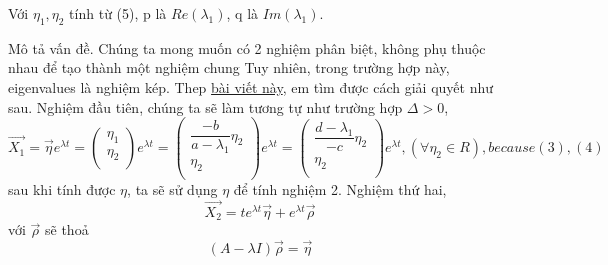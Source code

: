     \begin{center}
        Với
        $\eta_1, \eta_2$ tính từ (5),
        p là $Re(\lambda_1)$,
        q là $Im(\lambda_1)$.
    \end{center}


    Mô tả vấn đề.
    Chúng ta mong muốn có 2 nghiệm phân biệt, không phụ thuộc nhau để tạo thành một nghiệm chung
    Tuy nhiên, trong trường hợp này, eigenvalues là nghiệm kép.
    Thep \href{https://tutorial.math.lamar.edu/Classes/DE/RepeatedEigenvalues.aspx}{bài viết này}, em tìm được cách giải quyết như sau.
    \newline
    \newline
    Nghiệm đầu tiên, chúng ta sẽ làm tương tự như trường hợp $\Delta > 0$,
    \begin{equation}
        \vec{X_1} = \vec{\eta} e^{\lambda t} =
        \begin{pmatrix}
            \eta_1 \\
            \eta_2 \\
        \end{pmatrix}
        e^{\lambda t}
        =
        \begin{pmatrix}
            \dfrac{-b}{a-\lambda_1}\eta_2 \\
            \eta_2 \\
        \end{pmatrix}
        e^{\lambda t}
        =
        \begin{pmatrix}
            \dfrac{d - \lambda_1}{-c}\eta_2 \\
            \eta_2 \\
        \end{pmatrix}
        e^{\lambda t}
        , (\forall \eta_2 \in R), because (3), (4)\label{eq:equation8}
    \end{equation}
    sau khi tính được $\eta$, ta sẽ sử dụng $\eta$ để tính nghiệm 2.
    \newline
    \newline
    Nghiệm thứ hai,
    \begin{equation}
        \vec{X_2} = t e^{\lambda t} \vec{\eta} + e^{\lambda t}\vec{\rho}\label{eq:equation6}
    \end{equation}
    \newline
    \newline
    \newline
    với $\vec{\rho}$ sẽ thoả
    \begin{equation*}
        (A - \lambda I) \vec{\rho} = \vec{\eta}
    \end{equation*}
